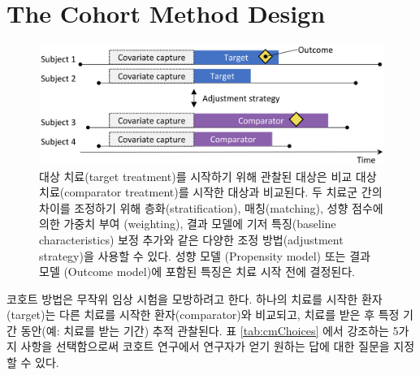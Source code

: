 \documentclass[11pt]{book}
\theoremstyle{definition}
\theoremstyle{definition}
\theoremstyle{definition}
\theoremstyle{remark}
\begin{document}
\section{The Cohort Method Design}\label{CohortMethod}


\begin{figure}

{\centering \includegraphics[width=0.9\linewidth]{images/PopulationLevelEstimation/cohortMethod} 

}

\caption{대상 치료(target treatment)를 시작하기 위해 관찰된 대상은 비교 대상 치료(comparator treatment)를 시작한 대상과 비교된다. 두 치료군 간의 차이를 조정하기 위해 층화(stratification), 매칭(matching), 성향 점수에 의한 가중치 부여 (weighting), 결과 모델에 기저 특징(baseline characteristics) 보정 추가와 같은 다양한 조정 방법(adjustment strategy)을 사용할 수 있다. 성향 모델 (Propensity model) 또는 결과 모델 (Outcome model)에 포함된 특징은 치료 시작 전에 결정된다.}\label{fig:cohortMethod}
\end{figure}

코호트 방법은 무작위 임상 시험을 모방하려고 한다\citep{hernan_2016}.
하나의 치료를 시작한 환자(target)는 다른 치료를 시작한
환자(comparator)와 비교되고, 치료를 받은 후 특정 기간 동안(예: 치료를
받는 기간) 추적 관찰된다. 표 \ref{tab:cmChoices} 에서 강조하는 5가지
사항을 선택함으로써 코호트 연구에서 연구자가 얻기 원하는 답에 대한
질문을 지정할 수 있다. 
 
\end{document}
